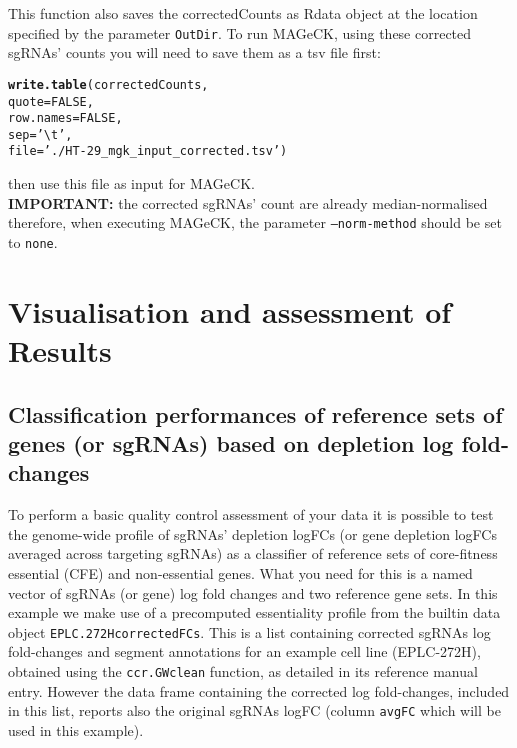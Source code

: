 \documentclass{article}\usepackage[]{graphicx}\usepackage[]{color}
\makeatletter
\newcommand{\hlnum}[1]{\textcolor[rgb]{0.686,0.059,0.569}{#1}}%
\newcommand{\hlstr}[1]{\textcolor[rgb]{0.192,0.494,0.8}{#1}}%
\newcommand{\hlstd}[1]{\textcolor[rgb]{0.345,0.345,0.345}{#1}}%
\newcommand{\hlkwc}[1]{\textcolor[rgb]{0.333,0.667,0.333}{#1}}%
\newcommand{\hlkwd}[1]{\textcolor[rgb]{0.737,0.353,0.396}{\textbf{#1}}}%
\newenvironment{kframe}{%
 \def\at@end@of@kframe{}%
 \ifinner\ifhmode%
  \def\at@end@of@kframe{\end{minipage}}%
  \begin{minipage}{\columnwidth}%
 \fi\fi%
 \def\FrameCommand##1{\hskip\@totalleftmargin \hskip-\fboxsep
 \colorbox{shadecolor}{##1}\hskip-\fboxsep
     \hskip-\linewidth \hskip-\@totalleftmargin \hskip\columnwidth}%
 \MakeFramed {\advance\hsize-\width
   \@totalleftmargin\z@ \linewidth\hsize
   \@setminipage}}%
 {\par\unskip\endMakeFramed%
 \at@end@of@kframe}
\newenvironment{knitrout}{}{} %
\makeatother
\begin{document}
This function also saves the correctedCounts as Rdata object at the location specified by the parameter \texttt{OutDir}.
To run MAGeCK, using these corrected sgRNAs' counts you will need to save them as a tsv file first:

\begin{knitrout}
\color{fgcolor}\begin{kframe}
\begin{alltt}
\hlkwd{write.table}\hlstd{(correctedCounts,}
            \hlkwc{quote}\hlstd{=}\hlnum{FALSE}\hlstd{,}
            \hlkwc{row.names} \hlstd{=} \hlnum{FALSE}\hlstd{,}
            \hlkwc{sep}\hlstd{=}\hlstr{'\textbackslash{}t'}\hlstd{,}
            \hlkwc{file}\hlstd{=}\hlstr{'./HT-29_mgk_input_corrected.tsv'}\hlstd{)}
\end{alltt}
\end{kframe}
\end{knitrout}

then use this file as input for MAGeCK.\\

\textbf{IMPORTANT:} the corrected sgRNAs' count are already median-normalised
therefore, when executing MAGeCK, the parameter \texttt{--norm-method} should be set to \texttt{none}.

\section{Visualisation and assessment of Results}

\subsection{Classification performances of reference sets of genes (or sgRNAs) based on depletion log fold-changes}

To perform a basic quality control assessment of your data it is possible to test the genome-wide profile of sgRNAs' depletion logFCs (or gene depletion logFCs averaged across targeting sgRNAs)
as a classifier of reference sets of core-fitness essential (CFE) and non-essential genes.
What you need for this is a named vector of sgRNAs (or gene) log fold changes and two reference gene sets. In this example we make use of a precomputed essentiality profile from the builtin data object \texttt{EPLC.272HcorrectedFCs}. This is a list containing corrected sgRNAs log fold-changes and segment annotations for an example cell line (EPLC-272H), obtained using the \texttt{ccr.GWclean} function, as detailed in its reference manual entry. However the data frame containing the corrected log fold-changes, included in this list, reports also the original sgRNAs logFC (column \texttt{avgFC} which will be used in this example).
\end{document}
